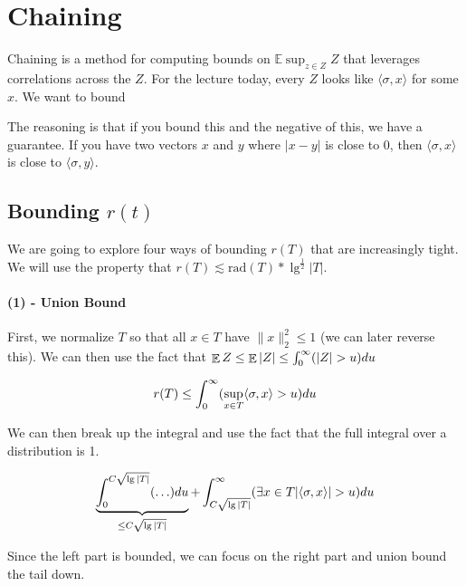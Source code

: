 \documentclass[11pt]{article}
\DeclareMathOperator*{\E}{\mathbb{E}}
\let\Pr\relax
\DeclareMathOperator*{\Pr}{\mathbb{P}}
\newcommand\myeq{\mathrel{\stackrel{\makebox[0pt]{\mbox{\normalfont\tiny def}}}{=}}}
\begin{document}
\section{Chaining}

Chaining is a method for computing bounds on $\mathbb{E}\sup_{z\in Z} Z$ that leverages correlations across the $Z$. For the lecture today, every $Z$ looks like $\langle \sigma, x \rangle$ for some $x$. We want to bound 

\framebox[1.1\width]{$\mathbb{E}\sup_{x \in T} \langle \sigma, x \rangle \myeq r(T)$} \par

The reasoning is that if you bound this and the negative of this, we have a guarantee. If you have two vectors $x$ and $y$ where $|x-y|$ is close to 0, then $\langle \sigma, x \rangle$ is close to $\langle \sigma, y \rangle$. 

\subsection{Bounding $r(t)$}

We are going to explore four ways of bounding $r(T)$ that are increasingly tight. We will use the property that $r(T) \lesssim \text{rad}(T) * \lg^{\frac{1}{2}}|T|$.


\paragraph{(1) - Union Bound}

First, we normalize $T$ so that all $x \in T$ have $\lVert x\rVert_2^2 \leq 1$ (we can later reverse this). We can then use the fact that $\E Z \leq \E |Z| \leq \int_0^\infty \Pr (|Z| > u) du$

\begin{equation*}
r(T) \leq \int_0^\infty \Pr (\sup_{x\in T} \langle \sigma, x \rangle > u) du
\end{equation*}

We can then break up the integral and use the fact that the full integral over a distribution is 1. 

\begin{equation*}
\underbrace{\int_0^{C\sqrt{\lg|T|}} \Pr (\ldots)du}_{\leq C\sqrt{\lg|T|}} + \int_{C\sqrt{\lg|T|}}^\infty \Pr (\exists x\in T |\langle \sigma, x \rangle| > u)du
\end{equation*}

Since the left part is bounded, we can focus on the right part and union bound the tail down. 
\end{document}
